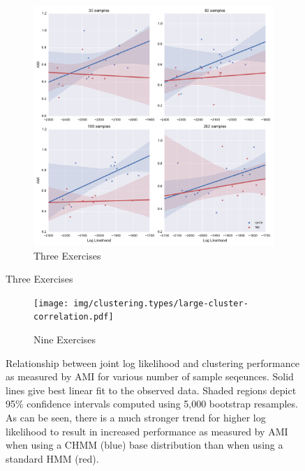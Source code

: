 \documentclass[12pt]{report}
\newcommand{\1}[0]{\mathbbm{1}}
\begin{document}
\begin{figure}[H]
    \centering
    \begin{subfigure}{\textwidth}
        \includegraphics[width=\textwidth]{img/clustering.types/cluster-correlation.pdf}
        \caption{Three Exercises}
        \label{fig:cluster-type-confusion-3}
    \end{subfigure}
\end{figure}

\begin{figure}[H]
    \centering
    \begin{subfigure}{\textwidth}
        \texttt{[image: img/clustering.types/large-cluster-correlation.pdf]}
        \caption{Nine Exercises}
        \label{fig:cluster-type-confusion-9}
    \end{subfigure}
    \caption[Relationship between log likelihood and AMI]{
        Relationship between joint log likelihood and clustering performance as measured
        by AMI for various number of sample seqeunces. Solid lines give best linear fit
        to the observed data. Shaded regions depict 95\% confidence intervals computed using
        5,000 bootstrap resamples. As can be seen, there is a much stronger trend for higher
        log likelihood to result in increased performance as measured by AMI when using a
        \ac{CHMM} (blue) base distribution than when using a standard \ac{HMM} (red).
    }
    \label{fig:cluster-type-correlation}
\end{figure}
\end{document}
